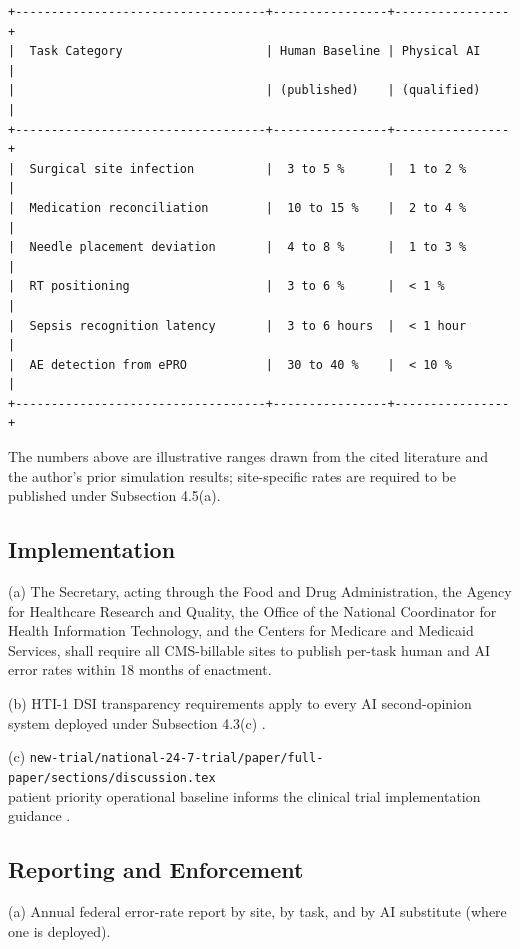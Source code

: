 \begin{verbatim}
+-----------------------------------+----------------+----------------+
|  Task Category                    | Human Baseline | Physical AI    |
|                                   | (published)    | (qualified)    |
+-----------------------------------+----------------+----------------+
|  Surgical site infection          |  3 to 5 %      |  1 to 2 %      |
|  Medication reconciliation        |  10 to 15 %    |  2 to 4 %      |
|  Needle placement deviation       |  4 to 8 %      |  1 to 3 %      |
|  RT positioning                   |  3 to 6 %      |  < 1 %         |
|  Sepsis recognition latency       |  3 to 6 hours  |  < 1 hour      |
|  AE detection from ePRO           |  30 to 40 %    |  < 10 %        |
+-----------------------------------+----------------+----------------+
\end{verbatim}

The numbers above are illustrative ranges drawn from the cited
literature and the author's prior simulation results; site-specific
rates are required to be published under Subsection 4.5(a).

\subsection{Implementation}

\hspace{0.5cm} (a) The Secretary, acting through the Food and Drug Administration,
the Agency for Healthcare Research and Quality, the Office of the
National Coordinator for Health Information Technology, and the
Centers for Medicare and Medicaid Services, shall require all CMS-billable sites to publish per-task human and AI error rates within
18 months of enactment.

(b) HTI-1 DSI transparency requirements apply to every AI second-opinion system deployed under Subsection 4.3(c)
\cite{hti1_dsi_fact_sheet_2023}.

(c) 
\texttt{new-trial/national-24-7-trial/paper/full-paper/sections/discussion.tex}\\patient priority operational baseline
informs the clinical trial implementation guidance \cite{kawchak_2026_19994945}.

\subsection{Reporting and Enforcement}

\hspace{0.5cm} (a) Annual federal error-rate report by site, by task, and by AI
substitute (where one is deployed).

